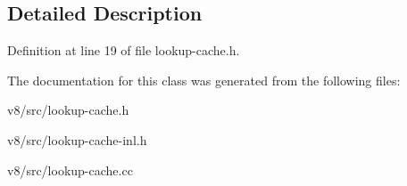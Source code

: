 \subsection{Detailed Description}


Definition at line 19 of file lookup-\/cache.\+h.



The documentation for this class was generated from the following files\+:\begin{DoxyCompactItemize}
\item 
v8/src/lookup-\/cache.\+h\item 
v8/src/lookup-\/cache-\/inl.\+h\item 
v8/src/lookup-\/cache.\+cc\end{DoxyCompactItemize}
